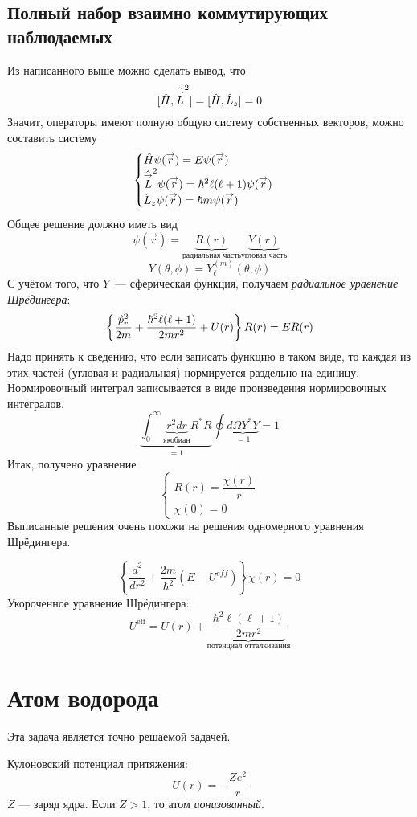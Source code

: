 \subsection{Полный набор взаимно коммутирующих наблюдаемых}
Из написанного выше можно сделать вывод, что
$$
    [\Hat H, \Hat{\vec L}^2] = [\Hat H, \Hat L_z] = 0
$$
Значит, операторы имеют полную общую систему собственных векторов, можно составить систему
$$
    \begin{cases}
        \Hat H \psi(\vec r) = E \psi(\vec r)\\
        \Hat{\vec L}^2 \psi(\vec r) = \hbar^2 \ell (\ell + 1) \psi(\vec r)\\
        \Hat L_z \psi(\vec r) = \hbar m \psi(\vec r)
    \end{cases}
$$
Общее решение должно иметь вид
$$
    \psi(\vec r) = \underbrace{R(r)}_\text{радиальная часть} \underbrace{Y(r)}_\text{угловая часть}
$$
$$
    Y(\theta, \phi) = Y_{\ell}^{(m)} (\theta, \phi)
$$
С учётом того, что $Y$~--- сферическая функция, получаем \emph{радиальное уравнение Шрёдингера}:
$$
\left\{
    \dfrac{\Hat p_r^2}{2m} + \dfrac{\hbar^2 \ell (\ell+1)}{2mr^2} + U(r)
\right\}
R(r) = E R(r)
$$
Надо принять к сведению, что если записать функцию в таком виде, то каждая из этих частей (угловая и радиальная) нормируется раздельно на единицу. Нормировочный интеграл записывается в виде произведения нормировочных интегралов. 
$$
    \underbrace{\int_{0}^\infty \underbrace{r^2 dr}_{\text{якобиан}} R^\ast R}_{=1} \oint \underbrace{d\Omega Y^\ast Y}_{=1} = 1
$$
Итак, получено уравнение
$$
    \begin{cases}
        R(r) = \dfrac{\chi(r)}{r}\\
        \chi(0) = 0
    \end{cases}
$$
Выписанные решения очень похожи на решения одномерного уравнения Шрёдингера.

$$
    \left\{ \dfrac{d^2}{dr^2} +\dfrac{2m}{\hbar^2} (E - U^{eff})
    \right\}
    \chi(r) = 0
$$
Укороченное уравнение Шрёдингера:
$$
    U^{\mathrm{eff}} = U(r) + \underbrace{\dfrac{\hbar^2 \ell(\ell+1)}{2mr^2}}_{\text{потенциал отталкивания}}
$$
\section{Атом водорода}
Эта задача является точно решаемой задачей.

Кулоновский потенциал притяжения:
$$
    U(r) = - \dfrac{Z e^2}{r}
$$
$Z$ --- заряд ядра. Если $Z > 1$, то атом \emph{ионизованный}.

